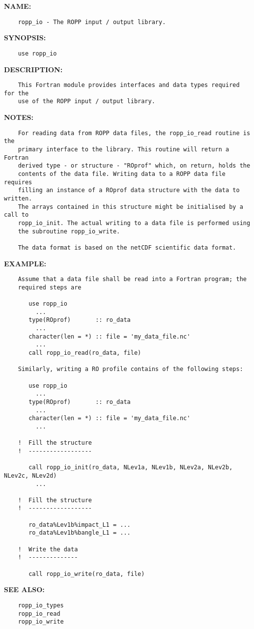 \label{ch:robo77}
\label{ch:Modules_ropp_io}
\textbf{NAME:}\hspace{0.08in}\begin{Verbatim}
    ropp_io - The ROPP input / output library.
\end{Verbatim}
\textbf{SYNOPSIS:}\hspace{0.08in}\begin{Verbatim}
    use ropp_io
\end{Verbatim}
\textbf{DESCRIPTION:}\hspace{0.08in}\begin{Verbatim}
    This Fortran module provides interfaces and data types required for the
    use of the ROPP input / output library.
\end{Verbatim}
\textbf{NOTES:}\hspace{0.08in}\begin{Verbatim}
    For reading data from ROPP data files, the ropp_io_read routine is the
    primary interface to the library. This routine will return a Fortran
    derived type - or structure - "ROprof" which, on return, holds the
    contents of the data file. Writing data to a ROPP data file requires
    filling an instance of a ROprof data structure with the data to written.
    The arrays contained in this structure might be initialised by a call to
    ropp_io_init. The actual writing to a data file is performed using
    the subroutine ropp_io_write.

    The data format is based on the netCDF scientific data format.
\end{Verbatim}
\textbf{EXAMPLE:}\hspace{0.08in}\begin{Verbatim}
    Assume that a data file shall be read into a Fortran program; the
    required steps are

       use ropp_io
         ...
       type(ROprof)       :: ro_data
         ...
       character(len = *) :: file = 'my_data_file.nc'
         ...
       call ropp_io_read(ro_data, file)

    Similarly, writing a RO profile contains of the following steps:

       use ropp_io
         ...
       type(ROprof)       :: ro_data
         ...
       character(len = *) :: file = 'my_data_file.nc'
         ...

    !  Fill the structure
    !  ------------------

       call ropp_io_init(ro_data, NLev1a, NLev1b, NLev2a, NLev2b, NLev2c, NLev2d)
         ...

    !  Fill the structure
    !  ------------------

       ro_data%Lev1b%impact_L1 = ...
       ro_data%Lev1b%bangle_L1 = ...

    !  Write the data
    !  --------------

       call ropp_io_write(ro_data, file)
\end{Verbatim}
\textbf{SEE ALSO:}\hspace{0.08in}\begin{Verbatim}
    ropp_io_types
    ropp_io_read
    ropp_io_write
\end{Verbatim}
